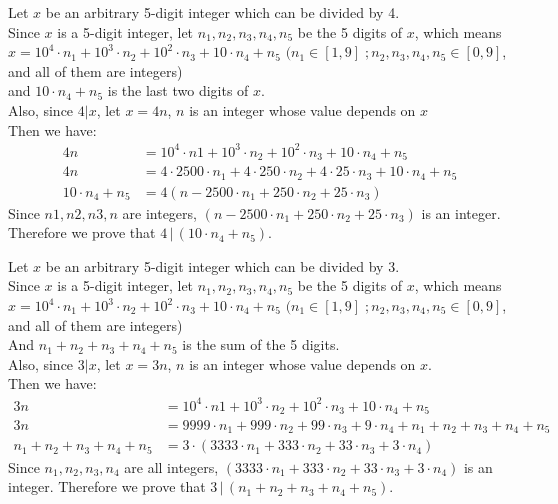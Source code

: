 \documentclass[12pt]{exam}
\newcommand{\divides}{\,|\,}
\begin{document}
\begin{solution}

\begin{qparts}
\item 
Let $x$ be an arbitrary 5-digit integer which can be divided by 4. \\
Since $x$ is a 5-digit integer, let $n_1,n_2,n_3,n_4,n_5$ be the  5 digits of $x$,  which means $x = 10^4 \cdot n_1 + 10 ^3 \cdot n_2 + 10^2 \cdot n_3 + 10 \cdot n_4 + n_5$ $ (n_1 \in [1,9]\; ; n_2, n_3,n_4,n_5\in [0,9]$, and all of them are integers) \\
and $10 \cdot n_4 + n_5$ is the last two digits of $x$.\\
Also, since $4 | x$, let $x = 4n$, $n$ is an integer whose value depends on $x$\\
Then we have: 
\begin{align*}
4n & = 10^4 \cdot n1 + 10 ^3 \cdot n_2 + 10^2 \cdot n_3 + 10 \cdot n_4 + n_5  \\
4n  & = 4 \cdot  2500 \cdot n_1 + 4 \cdot 250 \cdot n_2 + 4 \cdot 25 \cdot n_3 + 10 \cdot n_4 + n_5 \\
10 \cdot n_4 + n_5  &= 4 (n -  2500 \cdot n_1 + 250 \cdot n_2 + 25 \cdot n_3)
\end{align*}
Since $n1,n2,n3,n$ are integers, $(n -  2500 \cdot n_1 + 250 \cdot n_2 + 25 \cdot n_3)$ is an integer.
Therefore we prove that $4 \divides (10 \cdot n_4 + n_5)$.
  
\item 
Let $x$ be an arbitrary 5-digit integer which can be divided by 3.\\
Since $x$ is a 5-digit integer, let $n_1,n_2,n_3,n_4,n_5$ be the  5 digits of $x$,  which means $x = 10^4 \cdot n_1 + 10 ^3 \cdot n_2 + 10^2 \cdot n_3 + 10 \cdot n_4 + n_5$ $ (n_1 \in [1,9]\; ; n_2, n_3,n_4,n_5\in [0,9]$, and all of them are integers) \\
And $n_1 + n_2 + n_3 + n_4 + n_5$ is the sum of the 5 digits.\\
Also, since $3 |x$, let $x = 3n$, $n$ is an integer whose value depends on $x$. \\
Then we have:
\begin{align*}
3n & = 10^4 \cdot n1 + 10 ^3 \cdot n_2 + 10^2 \cdot n_3 + 10 \cdot n_4 + n_5  \\
3n  & = 9999 \cdot n_1 + 999 \cdot n_2 + 99 \cdot n_3 + 9 \cdot n_4 + n_1 + n_2 + n_3 + n_4 + n_5 \\
n_1 + n_2 + n_3 + n_4 + n_5 &= 
3 \cdot (3333 \cdot n_1 + 333 \cdot n_2 + 33 \cdot n_3 + 3\cdot n_4)
\end{align*}
Since $n_1,n_2,n_3,n_4$ are all integers, $(3333 \cdot n_1 + 333 \cdot n_2 + 33 \cdot n_3 + 3\cdot n_4)$ is an integer.
Therefore we prove that $3 \divides (n_1 + n_2 + n_3 + n_4 + n_5 )$.

\end{qparts}

\end{solution}
\end{document}
